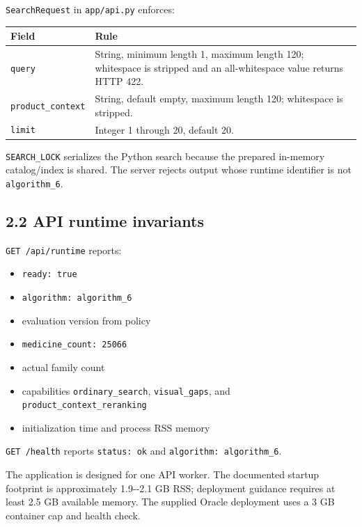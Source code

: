 \texttt{SearchRequest} in \texttt{app/api.py} enforces:

{\def\LTcaptype{none} %
\begin{longtable}[]{@{}>{\RaggedRight\arraybackslash}p{.27\linewidth}>{\RaggedRight\arraybackslash}p{.66\linewidth}@{}}
\toprule\noalign{}
Field & Rule \\
\midrule\noalign{}
\endhead
\bottomrule\noalign{}
\endlastfoot
\texttt{query} & String, minimum length 1, maximum length 120; whitespace is stripped and an all-whitespace value returns HTTP 422. \\
\texttt{product\_\allowbreak{}context} & String, default empty, maximum length 120; whitespace is stripped. \\
\texttt{limit} & Integer 1 through 20, default 20. \\
\end{longtable}
}

\texttt{SEARCH\_\allowbreak{}LOCK} serializes the Python search because the prepared in-memory catalog/index is shared. The server rejects output whose runtime identifier is not \texttt{algorithm\_\allowbreak{}6}.

\subsection{2.2 API runtime invariants}\label{22-api-runtime-invariants}

\texttt{GET\ /api/runtime} reports:

\begin{itemize}
\tightlist
\item
  \texttt{ready:\ true}
\item
  \texttt{algorithm:\ algorithm\_\allowbreak{}6}
\item
  evaluation version from policy
\item
  \texttt{medicine\_\allowbreak{}count:\ 25066}
\item
  actual family count
\item
  capabilities \texttt{ordinary\_\allowbreak{}search}, \texttt{visual\_\allowbreak{}gaps}, and \texttt{product\_\allowbreak{}context\_\allowbreak{}reranking}
\item
  initialization time and process RSS memory
\end{itemize}

\texttt{GET\ /health} reports \texttt{status:\ ok} and \texttt{algorithm:\ algorithm\_\allowbreak{}6}.

The application is designed for one API worker. The documented startup footprint is approximately 1.9-\/-2.1 GB RSS; deployment guidance requires at least 2.5 GB available memory. The supplied Oracle deployment uses a 3 GB container cap and health check.


